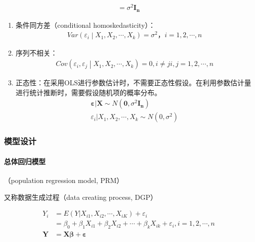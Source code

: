 \documentclass[12pt]{book}
\begin{document}
\begin{enumerate}[1.]
\begin{gather*}
              =\sigma^2\mathbf{I_n}
          \end{gather*}
          \begin{enumerate}[(1)]
              \item 条件同方差（conditional homoskedasticity）：
                    \begin{gather*}
                        Var\left(\varepsilon_i\middle| X_1,X_2,\cdots,X_k\right)=\sigma^2，i=1,2,\cdots,n
                    \end{gather*}
              \item 序列不相关：
                    \begin{gather*}
                        Cov\left (\varepsilon_i,\varepsilon_j\middle| X_1,X_2,\cdots,X_k\right)=0,i\neq j  i,j=1,2,\cdots,n
                    \end{gather*}
              \item 正态性：在采用OLS进行参数估计时，不需要正态性假设。在利用参数估计量进行统计推断时，需要假设随机项的概率分布。
                    \begin{gather*}
                        \bm{\varepsilon}|\mathbf{X}\sim N(\mathbf{0},\sigma^2\mathbf{I_n})\\
                        \varepsilon_i|X_1,X_2,\cdots,X_k\sim N(0,\sigma^2)
                    \end{gather*}
          \end{enumerate}
\end{enumerate}



\subsubsection{模型设计}

\paragraph{总体回归模型}

（population regression model, PRM）

又称数据生成过程（data creating process, DGP）

\begin{align*}
Y_{i} &= E(Y|X_{i1},X_{i2},\cdots,X_{iK})+\varepsilon_{i}\\ 
&=\beta_{0} + \beta_{1}X_{i1}+\beta_{2}X_{i2}+\cdots+\beta_{k}X_{ik}+\varepsilon_{i}, i=1,2,⋯,n\\ 
\bm{Y}&=\bm{X\beta}+\bm{\varepsilon}
\end{align*}
\end{document}
